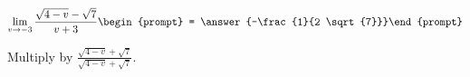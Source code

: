 \documentclass{ximera}
\author{Bart Snapp}
\begin{document}
\begin{exercise}

\[
\lim_{v\to -3 } \frac{\sqrt{4-v}-\sqrt{7}}{v+3}\begin{prompt} = \answer{-\frac{1}{2 \sqrt{7}}}\end{prompt}
\]
\begin{hint}
Multiply by $\frac{\sqrt{4-v}+\sqrt{7}}{\sqrt{4-v}+\sqrt{7}}$.
\end{hint}
\end{exercise}
\end{document}
